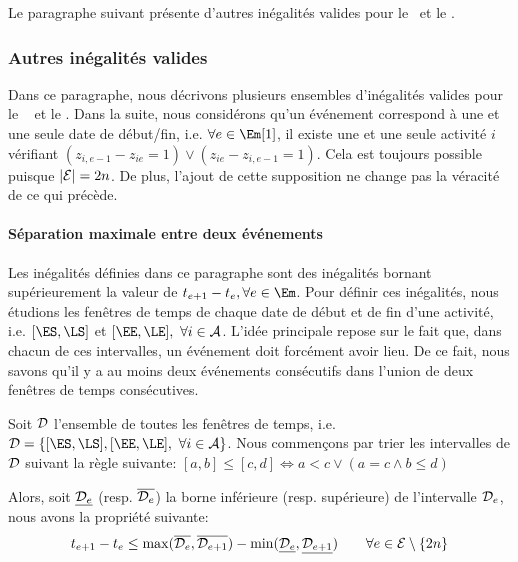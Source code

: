 Le paragraphe suivant présente d'autres inégalités valides pour le
\CECSP~et le \RCPSP. 

\subsubsection{Autres inégalités valides}

Dans ce paragraphe, nous décrivons plusieurs ensembles d'inégalités
valides pour le \RCPSP~ et le \CECSP. Dans la suite, nous considérons
qu'un événement correspond à une et une seule date de début/fin,
i.e. $\forall e \in \Em[1]$, il existe une et une seule activité $i$
vérifiant $(z_{i,e-1}-z_{ie}=1) \vee (z_{ie}-z_{i,e-1}=1)$. Cela est
toujours possible puisque $|{\cal E}|=2n$. De plus, l'ajout de cette
supposition ne change pas la véracité de ce qui précède. 

\paragraph{Séparation maximale entre deux événements} 

Les inégalités définies dans ce paragraphe sont des inégalités bornant
supérieurement la valeur de $t_{e+1}- t_e, \forall e\in \Em$. Pour
définir ces inégalités, nous étudions les fenêtres de temps de chaque
date de début et de fin d'une activité, i.e. $[\ES,\LS]$ et
$[\EE,\LE],\ \forall i \in \A$. L'idée principale repose sur le fait
que, dans chacun de ces intervalles, un événement doit forcément avoir
lieu. De ce fait, nous savons qu'il y a au moins deux événements
consécutifs dans l'union de deux fenêtres de temps consécutives. 

Soit ${\cal D}$ l'ensemble de toutes les fenêtres de temps, i.e. ${\cal
D}=\{[\ES,\LS] , [\EE,\LE],\ \forall i \in \A\}$. Nous commençons par
trier les intervalles de $\cal D$ suivant la règle suivante: 
$[a,b] \le [c,d]
\Leftrightarrow a<c \lor \left( a=c \land b\le d\right)$

Alors, soit $\underline{{\cal D}_e}$ (resp. $\overline{{\cal D}_e}$)
la borne inférieure (resp. supérieure) de l'intervalle ${\cal D}_e$,
nous avons la propriété suivante:
\begin{equation} \label{sep_CECSP_OO} 
t_{e+1}-t_e \le \max(\overline{{\cal D}_e},\overline{{\cal D}_{e+1}}) -
\min(\underline{{\cal D}_e},\underline{{\cal D}_{e+1}}) \qquad \forall e \in {\cal E}\setminus\{2n\}
\end{equation}

